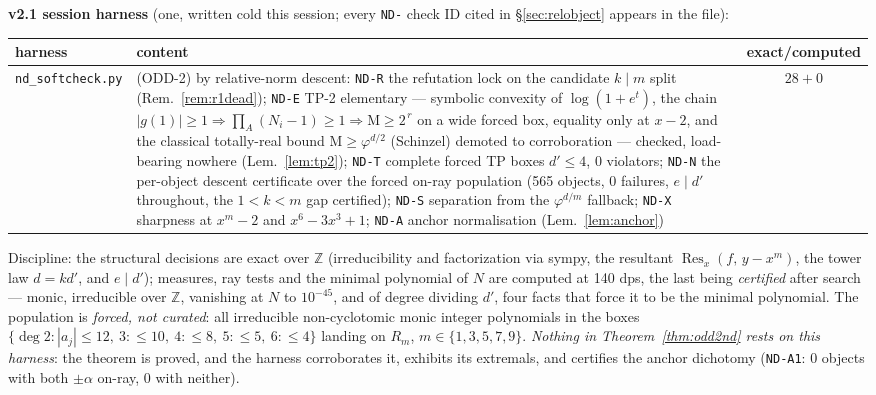 \documentclass[11pt]{article}
\newcommand{\hx}[1]{\textcolor{cC}{\footnotesize\texttt{#1}}}
\newcommand{\Z}{\mathbb{Z}}
\newcommand{\gp}{\varphi}
\newcommand{\M}{\mathrm{M}}
\theoremstyle{plain}
\theoremstyle{definition}
\theoremstyle{remark}
\begin{document}
\smallskip\noindent
\textbf{v2.1 session harness} (one, written cold this session; every \hx{ND-}
check ID cited in \S\ref{sec:relobject} appears in the file):
\begin{center}\footnotesize\setlength{\tabcolsep}{4pt}
\begin{tabular}{@{}lp{10.7cm}c@{}}
\toprule
harness & content & exact/computed\\
\midrule
\texttt{nd\_softcheck.py} & (ODD-2) by relative-norm descent: \hx{ND-R} the refutation lock on the candidate $k\mid m$ split (Rem.~\ref{rem:r1dead}); \hx{ND-E} TP-2 elementary --- symbolic convexity of $\log(1+e^t)$, the chain $|g(1)|\ge1\Rightarrow\prod_A(N_i-1)\ge1\Rightarrow\M\ge2^{\,r}$ on a wide forced box, equality only at $x-2$, and the classical totally-real bound $\M\ge\gp^{d/2}$ (Schinzel) demoted to corroboration --- checked, load-bearing nowhere (Lem.~\ref{lem:tp2}); \hx{ND-T} complete forced TP boxes $d'\le4$, $0$ violators; \hx{ND-N} the per-object descent certificate over the forced on-ray population (565 objects, $0$ failures, $e\mid d'$ throughout, the $1<k<m$ gap certified); \hx{ND-S} separation from the $\gp^{d/m}$ fallback; \hx{ND-X} sharpness at $x^m-2$ and $x^6-3x^3+1$; \hx{ND-A} anchor normalisation (Lem.~\ref{lem:anchor}) & $28+0$\\
\bottomrule
\end{tabular}
\end{center}
Discipline: the structural decisions are exact over $\Z$ (irreducibility and
factorization via sympy, the resultant $\operatorname{Res}_x(f,\,y-x^m)$, the
tower law $d=kd'$, and $e\mid d'$); measures, ray tests and the minimal
polynomial of $N$ are computed at 140 dps, the last being \emph{certified} after
search --- monic, irreducible over $\Z$, vanishing at $N$ to $10^{-45}$, and of
degree dividing $d'$, four facts that force it to be the minimal polynomial. The
population is \emph{forced, not curated}: all irreducible non-cyclotomic monic
integer polynomials in the boxes $\{\deg2:|a_j|\le12,\ 3:\le10,\ 4:\le8,\
5:\le5,\ 6:\le4\}$ landing on $R_m$, $m\in\{1,3,5,7,9\}$. \emph{Nothing in
Theorem~\ref{thm:odd2nd} rests on this harness}: the theorem is proved, and the
harness corroborates it, exhibits its extremals, and certifies the anchor
dichotomy (\hx{ND-A1}: $0$ objects with both $\pm\alpha$ on-ray, $0$ with
neither).
\end{document}
